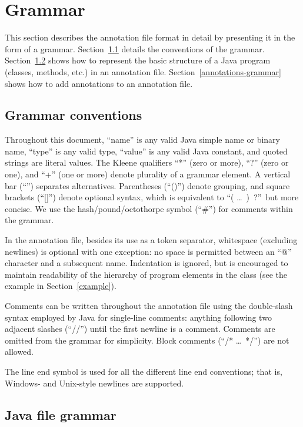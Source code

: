 \documentclass{article}
\begin{document}
\section{Grammar}\label{grammar}

This section describes the annotation file format in detail by presenting it in
the form of a grammar. Section~\ref{grammar-conventions} details the conventions
of the grammar. Section~\ref{java-file-grammar} shows how to represent the
basic structure of a Java program (classes, methods, etc.) in an annotation
file. Section~\ref{annotations-grammar} shows how to add annotations to an
annotation file.

\subsection{Grammar conventions}\label{grammar-conventions}

Throughout this document, ``name'' is any valid Java simple name or
binary name, ``type'' is any valid type, ``value'' is any
valid Java constant, and quoted strings are literal values.
%
The Kleene qualifiers ``*'' (zero or more), ``?'' (zero or one), and ``+''
(one or more) denote plurality of a grammar element.
%
A vertical bar (``\bnfor'') separates alternatives.
Parentheses (``()'') denote grouping, and square brackets (``[]'')
denote optional syntax, which is equivalent to ``( \ldots\ )\ ?''\ but more concise.
We use the hash/pound/octothorpe symbol (``\#'') for comments within the grammar.

In the annotation file,
besides its use as a token separator,
whitespace (excluding
newlines) is optional with one exception: no space is permitted
between an ``@'' character and a subsequent name. Indentation is
ignored, but is encouraged to maintain readability of the hierarchy of
program elements in the class (see the example in Section~\ref{example}).

Comments can be written throughout the annotation file using the double-slash
syntax employed by Java for single-line comments: anything following
two adjacent slashes (``//'') until the first newline is a comment.
Comments are omitted from the grammar for simplicity.
Block comments (``/* \ldots\ */'') are not allowed.

The line end symbol \lineend{} is used for all the different line end
conventions; that is, Windows- and Unix-style newlines are supported.


\subsection{Java file grammar}\label{java-file-grammar}
\end{document}
